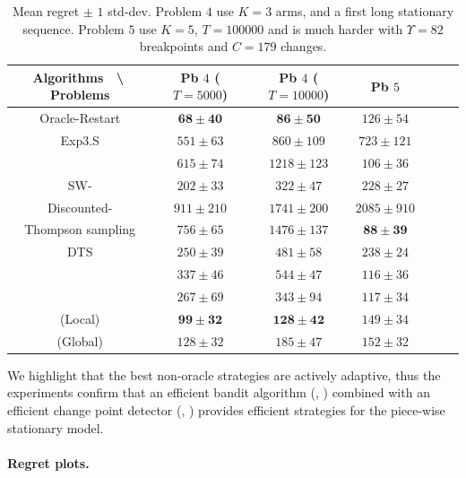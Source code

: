 \begin{table}[ht]
    \centering
    \begin{tabular}{c|cccccc}
        \textbf{Algorithms} $\;$ \textbackslash $\;$ \textbf{Problems} & Pb $4$ ($T=5000$) & Pb $4$ ($T=10000$) & Pb $5$ \\
        \hline
        Oracle-Restart \klUCB{} & $\mathbf{68 \pm 40}$ & $\mathbf{86 \pm 50}$ & $126 \pm 54$ \\
        \hline
        Exp3.S & $551 \pm 63$ & $860 \pm 109$ & $723 \pm 121$ \\
        \hline
        \klUCB{} & $615 \pm 74$ & $1218 \pm 123$ & $106 \pm 36$ \\
        SW-\klUCB{} & $202 \pm 33$ & $322 \pm 47$ & $228 \pm 27$ \\
        Discounted-\klUCB{} & $911 \pm 210$ & $1741 \pm 200$ & $2085 \pm 910$ \\
        \hline
        Thompson sampling & $756 \pm 65$ & $1476 \pm 137$ & $\mathbf{88 \pm 39}$ \\
        DTS & $250 \pm 39$ & $481 \pm 58$ & $238 \pm 24$ \\
        \hline
        \MklUCB{} & $337 \pm 46$ & $544 \pm 47$ & $116 \pm 36$ \\
        \CUSUMklUCB{} & $267 \pm 69$ & $343 \pm 94$ & $117 \pm 34$ \\
        \hline
        \GLRklUCB{}(Local) & $\mathbf{99 \pm 32}$ & $\mathbf{128 \pm 42}$ & $149 \pm 34$ \\
        \GLRklUCB{}(Global) & $128 \pm 32$ & $185 \pm 47$ & $152 \pm 32$
    \end{tabular}
    \caption{Mean regret $\pm$ $1$ std-dev. Problem $4$ use $K=3$ arms, and a first long stationary sequence. Problem $5$ use $K=5$, $T=100000$ and is much harder with $\Upsilon=82$ breakpoints and $C=179$ changes.}
    \label{table:6:totalResults2}
\end{table}

We highlight that the best non-oracle strategies are actively adaptive,
thus the experiments confirm that an efficient bandit algorithm (\eg, \klUCB) combined with an efficient change point detector (\eg, \GLR) provides efficient strategies for the piece-wise stationary model.


\paragraph{Regret plots.}
\label{subsub:6:regretPlots}

